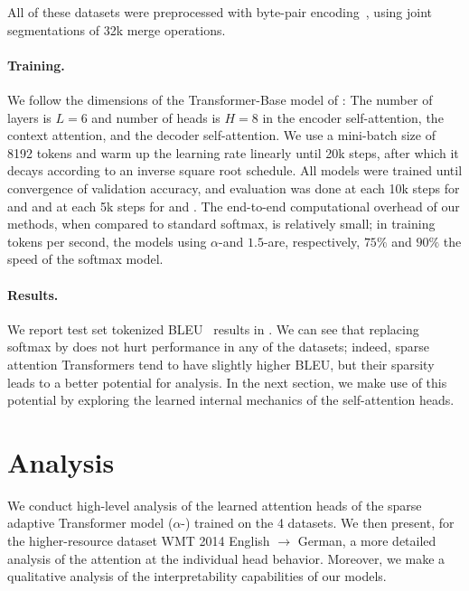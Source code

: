 All of these datasets were preprocessed with byte-pair
encoding~\citep[BPE;][]{sennrich2016neural}, using joint
segmentations of 32k merge operations.

\paragraph*{Training.}
We follow the dimensions of the Transformer-Base model of
\citet{vaswani2017attention}: The number of layers is $L=6$ and
number of heads is $H=8$ in the encoder self-attention, the context
attention, and the decoder self-attention. We use a mini-batch size
of 8192 tokens and warm up the learning rate linearly until 20k
steps, after which it decays according to an inverse square root
schedule. All models were trained until convergence of validation
accuracy, and evaluation was done at each 10k steps for
 and  and at each 5k steps for
 and . The end-to-end computational
overhead of our methods, when compared to standard softmax, is
relatively small; in training tokens per second, the models using
$\alpha$-\entmaxtext and $1.5$-\entmaxtext are, respectively, $75\%$
and $90\%$ the speed of the softmax model.

\paragraph*{Results.}
We report test set tokenized BLEU~\citep{papineni2002bleu} results in
. We can see that replacing softmax by
\entmaxtext{} does not hurt performance in any of the datasets;
indeed, sparse attention Transformers tend to have slightly higher
BLEU, but their sparsity leads to a better potential for analysis. In
the next section, we make use of this potential by exploring the
learned internal mechanics of the self-attention heads.

\section{Analysis}

We conduct high-level analysis of the learned attention heads of the
sparse adaptive Transformer model ($\alpha$-\entmaxtext) trained on
the 4 datasets. We then present, for the higher-resource dataset WMT
2014 English $\rightarrow$ German, a more detailed analysis of the
attention at the individual head behavior. Moreover, we make a
qualitative analysis of the interpretability capabilities of our
models.

